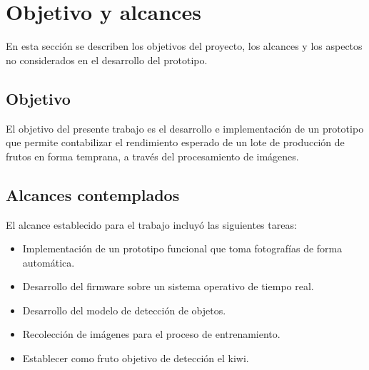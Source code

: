 

\section{Objetivo y alcances}

En esta sección se describen los objetivos del proyecto, los alcances y los aspectos no considerados en el desarrollo del prototipo.

\subsection{Objetivo}

El objetivo del presente trabajo es el desarrollo e implementación de un prototipo que permite contabilizar el rendimiento esperado de un lote de producción de frutos en forma temprana, a través del procesamiento de imágenes.

\subsection{Alcances contemplados}
El alcance establecido para el trabajo incluyó las siguientes tareas:

\begin{itemize}
\item Implementación de un prototipo funcional que toma fotografías de forma automática.
\item Desarrollo del firmware sobre un sistema operativo de tiempo real.
\item Desarrollo del modelo de detección de objetos.
\item Recolección de imágenes para el proceso de entrenamiento.
\item Establecer como fruto objetivo  de detección el kiwi.
\end{itemize}

